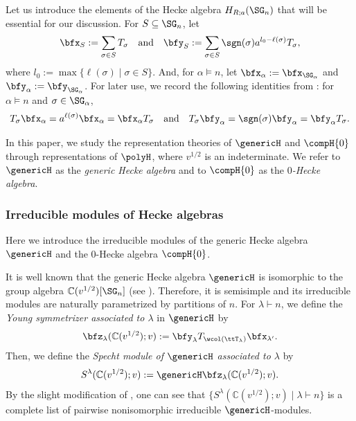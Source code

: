 \documentclass[12pt, reqno]{amsart}
\theoremstyle{plain}
\theoremstyle{definition}
\numberwithin{equation}{section}
\numberwithin{figure}{section}
\numberwithin{table}{section}
\def\C{\mathbb C}
\begin{document}
Let us introduce the  elements of the Hecke algebra $H_{R;a}(\SG_n)$ that will be essential for our discussion.
For $S \subseteq \SG_n$, let 
\begin{align}\label{eq: def of bfx and bfy}
\bfx_S := \sum_{\sigma \in S} T_\sigma 
\quad \text{and} \quad 
\bfy_S := \sum_{\sigma \in S} \sgn(\sigma) a^{l_0 - \ell(\sigma)}T_\sigma,
\end{align}
where $l_0 := \max\{\ell(\sigma) \mid \sigma \in S \}$. And,
for $\alpha \models n$, let $\bfx_\alpha := \bfx_{\SG_\alpha}$
 and $\bfy_\alpha := \bfy_{\SG_\alpha}$.
For later use, we record the following identities from \cite[p.~843]{86Gyoja}:
for $\alpha \models n$ and $\sigma \in \SG_\alpha$,
\begin{align}\label{eq: Ti and bfy}
T_\sigma \bfx_\alpha = a^{\ell(\sigma)} \bfx_\alpha
= \bfx_\alpha T_\sigma 
\quad\text{and}\quad 
T_\sigma \bfy_\alpha 
= \sgn(\sigma) \bfy_\alpha
=
\bfy_\alpha T_\sigma.
\end{align}

In this paper, we study the representation theories of $\genericH$ and $\compH{0}$ through representations of $\polyH$, where $v^{1/2}$ is an indeterminate.
We refer to $\genericH$ as the \emph{generic Hecke algebra} and to $\compH{0}$ as the \emph{$0$-Hecke algebra}.

\subsubsection{Irreducible modules of Hecke algebras}
Here we introduce the irreducible modules of the generic Hecke algebra $\genericH$ and the $0$-Hecke algebra $\compH{0}$.

It is well known that 
the generic Hecke algebra $\genericH$ is isomorphic to the group algebra $\C(v^{1/2})[\SG_n]$ (see \cite{02Bourbaki, 81Lusztig}).
Therefore, it is semisimple and its irreducible modules are naturally parametrized by partitions of $n$.
For $\lambda \vdash n$, we define the \emph{Young symmetrizer associated to $\lambda$} in $\genericH$ by
\begin{align*}
\bfz_{\lambda}(\C(v^{1/2});v) := \bfy_{\lambda} T_{\wcol(\ttT_{\lambda})} \bfx_{\lambda'}.
\end{align*}
Then, we define the \emph{Specht module  of $\genericH$ associated to $\lambda$} by 
\begin{align*}
S^{\lambda}(\C(v^{1/2});v) := \genericH \bfz_{\lambda}(\C(v^{1/2});v).
\end{align*}
By the slight modification of \cite[Theorem ]{86DJ}, one can see that 
 $\{S^\lambda(\C(v^{1/2});v) \mid \lambda \vdash n \}$ is a complete list of pairwise nonisomorphic irreducible  $\genericH$-modules.
\end{document}
